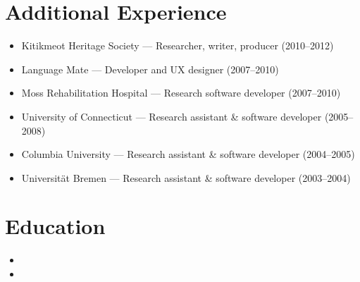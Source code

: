 \documentclass[11pt,a4paper,sans]{moderncv}
\begin{document}

\section{Additional Experience}
\vspace{1pt}
\begin{itemize}
\item Kitikmeot Heritage Society — Researcher, writer, producer (2010--2012)
\item Language Mate — Developer and UX designer (2007--2010)
\item Moss Rehabilitation Hospital — Research software developer (2007--2010)
\item University of Connecticut — Research assistant \& software developer (2005--2008)
\item Columbia University — Research assistant \& software developer (2004--2005)
\item Universität Bremen — Research assistant \& software developer (2003--2004)
\end{itemize}


\section{Education}
\vspace{1pt}
\begin{itemize}

\item{}

\vspace{3pt}

\item{}

\end{itemize}
\end{document}
